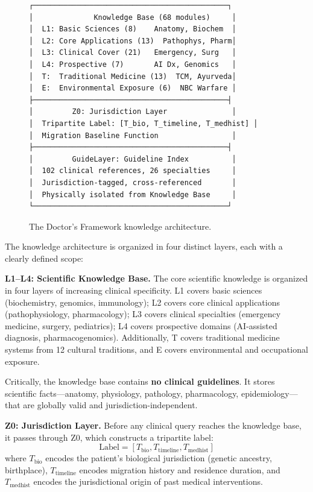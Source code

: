 \documentclass[11pt]{article}
\begin{document}
\begin{figure}[h]
\centering
\begin{verbatim}
┌─────────────────────────────────────────────┐
│              Knowledge Base (68 modules)     │
│  L1: Basic Sciences (8)    Anatomy, Biochem  │
│  L2: Core Applications (13)  Pathophys, Pharm│
│  L3: Clinical Cover (21)   Emergency, Surg   │
│  L4: Prospective (7)       AI Dx, Genomics   │
│  T:  Traditional Medicine (13)  TCM, Ayurveda│
│  E:  Environmental Exposure (6)  NBC Warfare │
├─────────────────────────────────────────────┤
│         Z0: Jurisdiction Layer               │
│  Tripartite Label: [T_bio, T_timeline, T_medhist] │
│  Migration Baseline Function                 │
├─────────────────────────────────────────────┤
│         GuideLayer: Guideline Index          │
│  102 clinical references, 26 specialties     │
│  Jurisdiction-tagged, cross-referenced       │
│  Physically isolated from Knowledge Base     │
└─────────────────────────────────────────────┘
\end{verbatim}
\caption{The Doctor's Framework knowledge architecture.}
\label{fig:knowledge}
\end{figure}

The knowledge architecture is organized in four distinct layers, each 
with a clearly defined scope:

\textbf{L1--L4: Scientific Knowledge Base.} The core scientific knowledge 
is organized in four layers of increasing clinical specificity. L1 covers 
basic sciences (biochemistry, genomics, immunology); L2 covers core 
clinical applications (pathophysiology, pharmacology); L3 covers clinical 
specialties (emergency medicine, surgery, pediatrics); L4 covers prospective 
domains (AI-assisted diagnosis, pharmacogenomics). Additionally, T covers 
traditional medicine systems from 12 cultural traditions, and E covers 
environmental and occupational exposure.

Critically, the knowledge base contains \textbf{no clinical guidelines}. 
It stores scientific facts---anatomy, physiology, pathology, pharmacology, 
epidemiology---that are globally valid and jurisdiction-independent.

\textbf{Z0: Jurisdiction Layer.} Before any clinical query reaches the 
knowledge base, it passes through Z0, which constructs a tripartite label:
\begin{equation}
\text{Label} = [T_{\text{bio}}, T_{\text{timeline}}, T_{\text{medhist}}]
\end{equation}
where $T_{\text{bio}}$ encodes the patient's biological jurisdiction 
(genetic ancestry, birthplace), $T_{\text{timeline}}$ encodes migration 
history and residence duration, and $T_{\text{medhist}}$ encodes the 
jurisdictional origin of past medical interventions.
\end{document}
